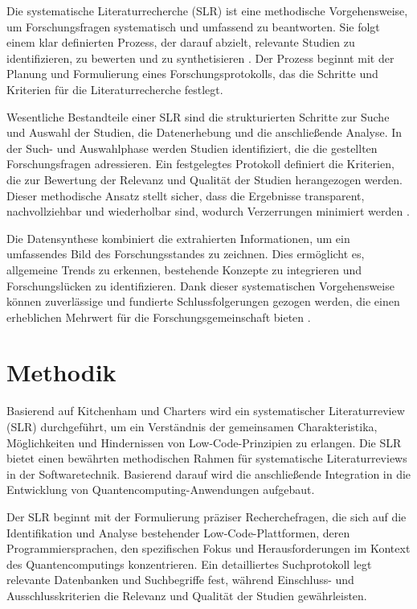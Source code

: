 Die systematische Literaturrecherche (SLR) ist eine methodische Vorgehensweise, um Forschungsfragen 
systematisch und umfassend zu beantworten. Sie folgt einem klar definierten Prozess, der darauf abzielt, 
relevante Studien zu identifizieren, zu bewerten und zu synthetisieren \cite{kitchenham2007guidelines}. 
Der Prozess beginnt mit der Planung und Formulierung eines Forschungsprotokolls, das die Schritte und 
Kriterien für die Literaturrecherche festlegt.

Wesentliche Bestandteile einer SLR sind die strukturierten Schritte zur Suche und Auswahl der Studien, 
die Datenerhebung und die anschließende Analyse. In der Such- und Auswahlphase werden Studien identifiziert, 
die die gestellten Forschungsfragen adressieren. Ein festgelegtes Protokoll definiert die Kriterien, die 
zur Bewertung der Relevanz und Qualität der Studien herangezogen werden. Dieser methodische Ansatz stellt 
sicher, dass die Ergebnisse transparent, nachvollziehbar und wiederholbar sind, wodurch Verzerrungen 
minimiert werden \cite{okoli2015guide}.

Die Datensynthese kombiniert die extrahierten Informationen, um ein umfassendes Bild des Forschungsstandes 
zu zeichnen. Dies ermöglicht es, allgemeine Trends zu erkennen, bestehende Konzepte zu integrieren und 
Forschungslücken zu identifizieren. Dank dieser systematischen Vorgehensweise können zuverlässige und 
fundierte Schlussfolgerungen gezogen werden, die einen erheblichen Mehrwert für 
die Forschungsgemeinschaft bieten \cite{petersen2008systematic}.

\section{Methodik}
Basierend auf Kitchenham und Charters \cite{kitchenham2007guidelines} wird ein systematischer 
Literaturreview (SLR) durchgeführt, um ein Verständnis der gemeinsamen Charakteristika, Möglichkeiten 
und Hindernissen von Low-Code-Prinzipien zu erlangen. Die SLR bietet einen bewährten methodischen 
Rahmen für systematische Literaturreviews in der Softwaretechnik. Basierend darauf wird die 
anschließende Integration in die Entwicklung von Quantencomputing-Anwendungen aufgebaut.

Der SLR beginnt mit der Formulierung präziser Recherchefragen, die sich auf die 
Identifikation und Analyse bestehender Low-Code-Plattformen, deren Programmiersprachen, 
den spezifischen Fokus und Herausforderungen im Kontext des Quantencomputings 
konzentrieren. Ein detailliertes Suchprotokoll legt relevante Datenbanken und 
Suchbegriffe fest, während Einschluss- und Ausschlusskriterien die Relevanz und Qualität 
der Studien gewährleisten.

